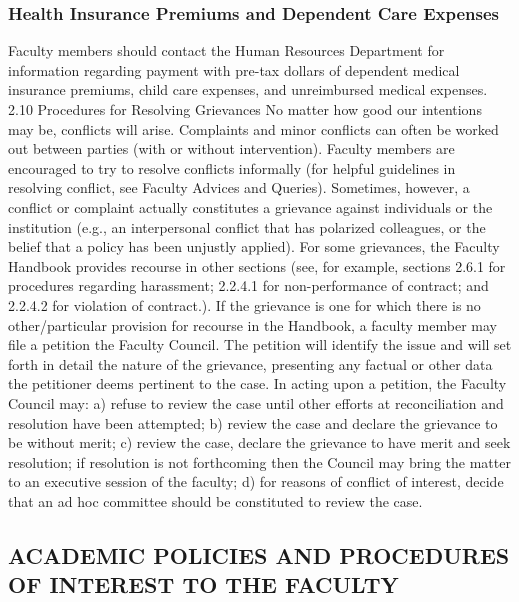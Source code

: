 \documentclass[letterpaper, 11pt]{article}
\begin{document}
		\subsubsection{Health Insurance Premiums and Dependent Care Expenses}
			Faculty members should contact the Human Resources Department for information regarding payment with pre-tax dollars of dependent medical insurance premiums, child care expenses, and unreimbursed medical expenses.
			2.10 Procedures for Resolving Grievances
			No matter how good our intentions may be, conflicts will arise.  Complaints and minor conflicts can often be worked out between parties (with or without intervention).  Faculty members are encouraged to try to resolve conflicts informally (for helpful guidelines in resolving conflict, see Faculty Advices and Queries).
			Sometimes, however, a conflict or complaint actually constitutes a grievance against individuals or the institution (e.g., an interpersonal conflict that has polarized colleagues, or the belief that a policy has been unjustly applied).  For some grievances, the Faculty Handbook provides recourse in other sections (see, for example, sections 2.6.1 for procedures regarding harassment; 2.2.4.1 for non-performance of contract; and 2.2.4.2 for violation of contract.).
			If the grievance is one for which there is no other/particular provision for recourse in the Handbook, a faculty member may file a petition the Faculty Council.  The petition will identify the issue and will set forth in detail the nature of the grievance, presenting any factual or other data the petitioner deems pertinent to the case.  In acting upon a petition, the Faculty Council may:
			a) refuse to review the case until other efforts at reconciliation and resolution have been attempted;
			b) review the case and declare the grievance to be without merit;
			c) review the case, declare the grievance to have merit and seek resolution; if resolution is not forthcoming then the Council may bring the matter to an executive session of the faculty;
			d) for reasons of conflict of interest, decide that an ad hoc committee should be constituted to review the case.

	\subsection{ACADEMIC POLICIES AND PROCEDURES OF INTEREST TO THE FACULTY}
\end{document}
